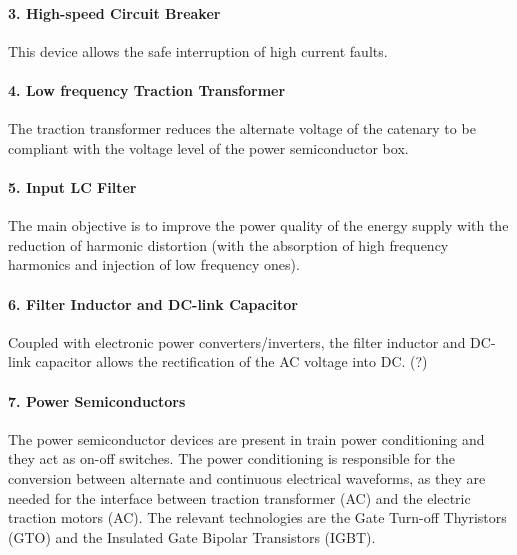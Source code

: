 \paragraph{3. High-speed Circuit Breaker\\}
	
	This device allows the safe interruption of high current faults.
	
\paragraph{4. Low frequency Traction Transformer\\}
	
	The traction transformer reduces the alternate voltage of the catenary to be compliant with the voltage level of the power semiconductor box.
	
\paragraph{5. Input LC Filter\\}

	The main objective is to improve the power quality of the energy supply with the reduction of harmonic distortion (with the absorption of high frequency harmonics and injection of low frequency ones).

\paragraph{6. Filter Inductor and DC-link Capacitor\\}

	Coupled with electronic power converters/inverters, the filter inductor and DC-link capacitor allows the rectification of the AC voltage into DC. (?)
	
\paragraph{7. Power Semiconductors\\}

	The power semiconductor devices are present in train power conditioning and they act as on-off switches. The power conditioning is responsible for the conversion between alternate and continuous  electrical waveforms, as they are needed for the interface between traction transformer (AC) and the electric traction motors (AC). The relevant technologies are the Gate Turn-off Thyristors (GTO) and the Insulated Gate Bipolar Transistors (IGBT).


